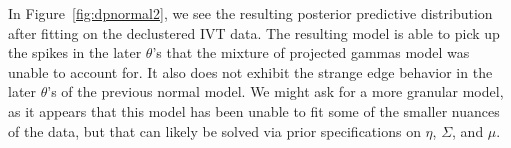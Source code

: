 In Figure~\ref{fig:dpnormal2}, we see the resulting posterior predictive distribution after fitting
  on the declustered IVT data.  The resulting model is able to pick up the spikes in the later
  $\theta$'s that the mixture of projected gammas model was unable to account for.  It also does
  not exhibit the strange edge behavior in the later $\theta$'s of the previous normal model.  We
  might ask for a more granular model, as it appears that this model has been unable to fit some of
  the smaller nuances of the data, but that can likely be solved via prior specifications on $\eta$,
  $\Sigma$, and $\mu$.














